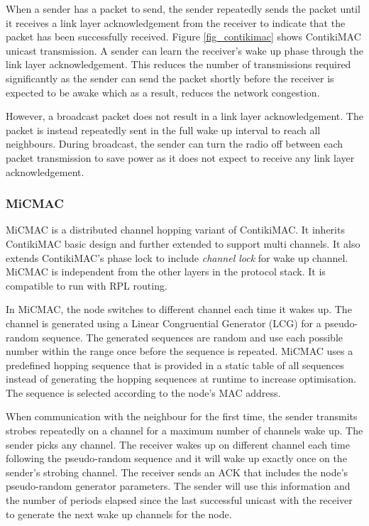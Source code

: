 When a sender has a packet to send, the sender repeatedly sends the packet until it receives a link layer acknowledgement from the receiver to indicate that the packet has been successfully received. Figure \ref{fig_contikimac} shows ContikiMAC unicast transmission. A sender can learn the receiver's wake up phase through the link layer acknowledgement. This reduces the number of transmissions required significantly as the sender can send the packet shortly before the receiver is expected to be awake which as a result, reduces the network congestion.

However, a broadcast packet does not result in a link layer acknowledgement. The packet is instead repeatedly sent in the full wake up interval to reach all neighbours. During broadcast, the sender can turn the radio off between each packet transmission to save power as it does not expect to receive any link layer acknowledgement.



\subsubsection{MiCMAC}
MiCMAC \cite{micmac} is a distributed channel hopping variant of ContikiMAC. It inherits ContikiMAC basic design and further extended to support multi channels. It also extends ContikiMAC's phase lock to include \textit{channel lock} for wake up channel. MiCMAC is independent from the other layers in the protocol stack. It is compatible to run with RPL routing.

In MiCMAC, the node switches to different channel each time it wakes up. The channel is generated using a Linear Congruential Generator (LCG) for a pseudo-random sequence. The generated sequences are random and use each possible number within the range once before the sequence is repeated. MiCMAC uses a predefined hopping sequence that is provided in a static table of all sequences instead of generating the hopping sequences at runtime to increase optimisation. The sequence is selected according to the node's MAC address.

When communication with the neighbour for the first time, the sender transmits strobes repeatedly on a channel for a maximum number of channels wake up. The sender picks any channel. The receiver wakes up on different channel each time following the pseudo-random sequence and it will wake up exactly once on the sender's strobing channel. The receiver sends an ACK that includes the node's pseudo-random generator parameters. The sender will use this information and the number of periods elapsed since the last successful unicast with the receiver to generate the next wake up channels for the node.

